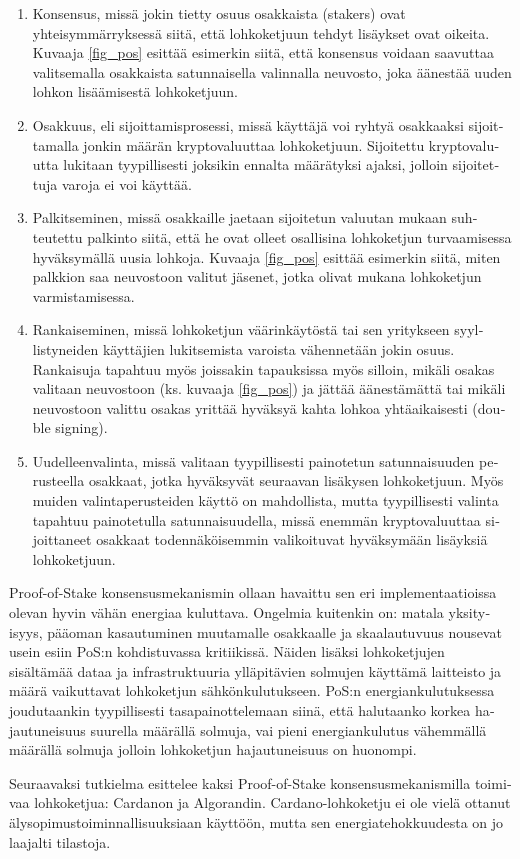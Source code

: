 \begin{otherlanguage}{english}
\begin{enumerate}
\item Konsensus, missä jokin tietty osuus osakkaista (stakers) ovat yhteisymmärryksessä siitä, että lohkoketjuun tehdyt lisäykset ovat oikeita. Kuvaaja \ref{fig_pos} esittää esimerkin siitä, että konsensus voidaan saavuttaa valitsemalla osakkaista satunnaisella valinnalla neuvosto, joka äänestää uuden lohkon lisäämisestä lohkoketjuun.
\item Osakkuus, eli sijoittamisprosessi, missä käyttäjä voi ryhtyä osakkaaksi sijoittamalla jonkin määrän kryptovaluuttaa lohkoketjuun. Sijoitettu kryptovaluutta lukitaan tyypillisesti joksikin ennalta määrätyksi ajaksi, jolloin sijoitettuja varoja ei voi käyttää.
\item Palkitseminen, missä osakkaille jaetaan sijoitetun valuutan mukaan suhteutettu palkinto siitä, että he ovat olleet osallisina lohkoketjun turvaamisessa hyväksymällä uusia lohkoja. Kuvaaja \ref{fig_pos} esittää esimerkin siitä, miten palkkion saa neuvostoon valitut jäsenet, jotka olivat mukana lohkoketjun varmistamisessa.
\item Rankaiseminen, missä lohkoketjun väärinkäytöstä tai sen yritykseen syyllistyneiden käyttäjien lukitsemista varoista vähennetään jokin osuus. Rankaisuja tapahtuu myös joissakin tapauksissa myös silloin, mikäli osakas valitaan neuvostoon (ks. kuvaaja \ref{fig_pos}) ja jättää äänestämättä tai mikäli neuvostoon valittu osakas yrittää hyväksyä kahta lohkoa yhtäaikaisesti (double signing).
\item Uudelleenvalinta, missä valitaan tyypillisesti painotetun satunnaisuuden perusteella osakkaat, jotka hyväksyvät seuraavan lisäkysen lohkoketjuun. Myös muiden valintaperusteiden käyttö on mahdollista, mutta tyypillisesti valinta tapahtuu painotetulla satunnaisuudella, missä enemmän kryptovaluuttaa sijoittaneet osakkaat todennäköisemmin valikoituvat hyväksymään lisäyksiä lohkoketjuun.
\end{enumerate}

Proof-of-Stake konsensusmekanismin ollaan havaittu sen eri implementaatioissa olevan hyvin vähän energiaa kuluttava. Ongelmia kuitenkin on: matala yksityisyys, pääoman kasautuminen muutamalle osakkaalle ja skaalautuvuus nousevat usein esiin PoS:n kohdistuvassa kritiikissä. Näiden lisäksi lohkoketjujen sisältämää dataa ja infrastruktuuria ylläpitävien solmujen käyttämä laitteisto ja määrä vaikuttavat lohkoketjun sähkönkulutukseen. PoS:n energiankulutuksessa joudutaankin tyypillisesti tasapainottelemaan siinä, että halutaanko korkea hajautuneisuus suurella määrällä solmuja, vai pieni energiankulutus vähemmällä määrällä solmuja jolloin lohkoketjun hajautuneisuus on huonompi.

Seuraavaksi tutkielma esittelee kaksi Proof-of-Stake konsensusmekanismilla toimivaa lohkoketjua: Cardanon ja Algorandin. Cardano-lohkoketju ei ole vielä ottanut älysopimustoiminnallisuuksiaan käyttöön, mutta sen energiatehokkuudesta on jo laajalti tilastoja.





\end{otherlanguage}
